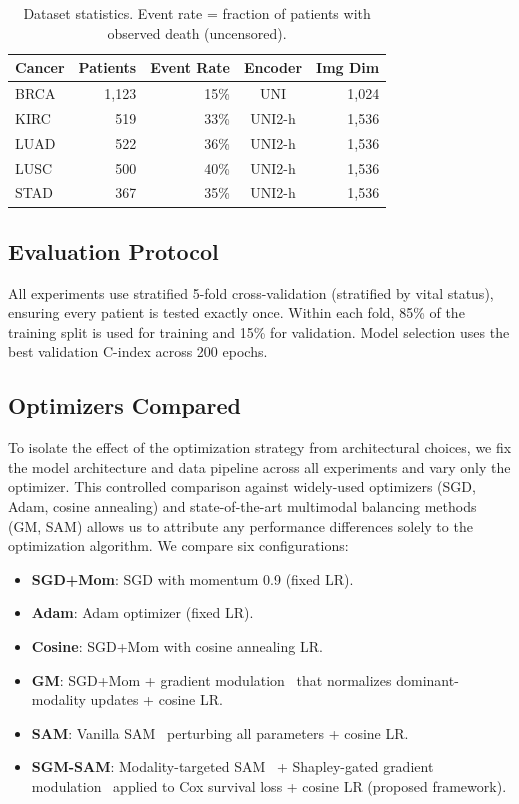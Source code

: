 \documentclass[runningheads]{llncs}
\begin{document}
\begin{table}[ht]
\centering
\caption{Dataset statistics. Event rate = fraction of patients with
observed death (uncensored).}
\label{tab:datasets}
\begin{tabular}{lrrcr}
\toprule
Cancer & Patients & Event Rate & Encoder & Img Dim \\
\midrule
BRCA & 1,123 & 15\% & UNI   & 1,024 \\
KIRC & 519   & 33\% & UNI2-h & 1,536 \\
LUAD & 522   & 36\% & UNI2-h & 1,536 \\
LUSC & 500   & 40\% & UNI2-h & 1,536 \\
STAD & 367   & 35\% & UNI2-h & 1,536 \\
\bottomrule
\end{tabular}
\end{table}

\subsection{Evaluation Protocol}

All experiments use stratified 5-fold cross-validation (stratified by
vital status), ensuring every patient is tested exactly once. Within
each fold, 85\% of the training split is used for training and 15\%
for validation. Model selection uses the best validation C-index across
200 epochs.

\subsection{Optimizers Compared}

To isolate the effect of the optimization strategy from
architectural choices, we fix the model architecture and data pipeline
across all experiments and vary only the optimizer. This controlled
comparison against widely-used optimizers (SGD, Adam, cosine
annealing) and state-of-the-art multimodal balancing methods (GM, SAM)
allows us to attribute any performance differences solely to the
optimization algorithm. We compare six configurations:

\begin{itemize}
\item \textbf{SGD+Mom}: SGD with momentum 0.9 (fixed LR).
\item \textbf{Adam}: Adam optimizer (fixed LR).
\item \textbf{Cosine}: SGD+Mom with cosine annealing LR.
\item \textbf{GM}: SGD+Mom + gradient modulation~\cite{peng2022ogm}
that normalizes dominant-modality updates + cosine LR.
\item \textbf{SAM}: Vanilla SAM~\cite{foret2021sam} perturbing all
parameters + cosine LR.
\item \textbf{SGM-SAM}: Modality-targeted
SAM~\cite{rajoli2025msam} + Shapley-gated gradient
modulation~\cite{peng2022ogm} applied to Cox survival loss + cosine
LR (proposed framework).
\end{itemize}
\end{document}
